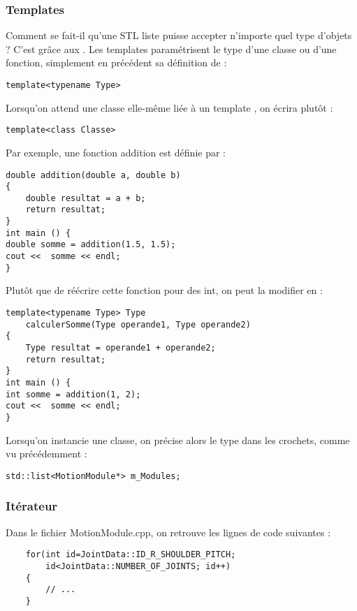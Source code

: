 \documentclass[abstracton]{scrartcl}
\begin{document}
\subsubsection{Templates}

Comment se fait-il qu'une STL liste puisse accepter n'importe quel type d'objets ? C'est grâce aux .
Les templates  paramétrisent le type d'une classe ou d'une fonction, simplement en précédent sa définition de :

 \lstinline{template<typename Type>}

Lorsqu'on attend une classe elle-même liée à un template \cite{diffClassTypename}, on écrira plutôt :

 \lstinline{template<class Classe>}


Par exemple, une fonction addition est définie par :
\begin{lstlisting}
double addition(double a, double b)
{
    double resultat = a + b;
    return resultat;
}
int main () {
double somme = addition(1.5, 1.5);
cout <<  somme << endl;
}
\end{lstlisting}

Plutôt que de réécrire cette fonction pour des int, on peut la modifier en :
\begin{lstlisting}
template<typename Type> Type
    calculerSomme(Type operande1, Type operande2)
{
    Type resultat = operande1 + operande2;
    return resultat;
}
int main () {
int somme = addition(1, 2);
cout <<  somme << endl;
}
\end{lstlisting}

 Lorsqu'on instancie une classe, on précise alors le type dans les crochets, comme vu précédemment :

 \lstinline{std::list<MotionModule*> m_Modules;}




\subsubsection{Itérateur}

Dans le fichier MotionModule.cpp, on retrouve les lignes de code suivantes :

\begin{lstlisting}
    for(int id=JointData::ID_R_SHOULDER_PITCH;
        id<JointData::NUMBER_OF_JOINTS; id++)
    {
        // ...
    }
\end{lstlisting}

\end{document}

